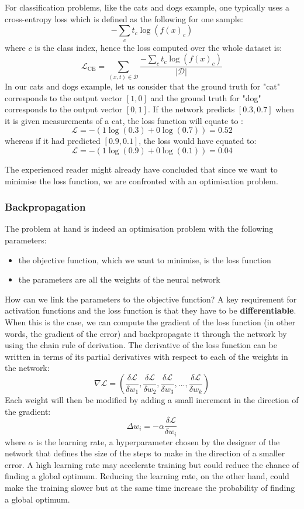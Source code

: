 For classification problems, like the cats and dogs example, one typically uses
a cross-entropy loss which is defined as the following for one sample:
$$-\sum\limits_c t_c\log(f(x)_c)$$
where $c$ is the class index, hence the loss computed over the whole dataset is:
$$\mathcal{L}_{\text{CE}} = \sum\limits_{(x, t) \in \mathcal{D}}
\frac{-\sum\limits_c t_c\log(f(x)_c)}{|\mathcal{D}|}$$
In our cats and dogs example, let us consider that the ground truth for
"cat" corresponds to the output vector $[1, 0]$ and the ground truth for "dog"
corresponds to the output vector $[0, 1]$. If the network predicts $[0.3, 0.7]$
when it is given measurements of a cat, the loss function will equate to :
$$ \mathcal{L} = -(1\log(0.3) + 0\log(0.7)) = 0.52$$
whereas if it had predicted $[0.9, 0.1]$, the loss would have equated to:
$$ \mathcal{L} = -(1\log(0.9) + 0\log(0.1)) = 0.04$$

The experienced reader might already have concluded that since we want to
minimise the loss function, we are confronted with an optimisation problem.

\subsubsection{Backpropagation}
\label{sec:backprop}
The problem at hand is indeed an optimisation problem with the following
parameters:
\begin{itemize}
	\item the objective function, which we want to minimise, is the loss 
		function
	\item the parameters are all the weights of the neural network
\end{itemize}
How can we link the parameters to the objective function? A key requirement
for activation functions and the loss function is that they have to be
\textbf{differentiable}. When this is the case, we can compute the gradient
of the loss function (in other words, the gradient of the error) and 
backpropagate it through the network by using the
chain rule of derivation. The derivative of the loss function can be written
in terms of its partial derivatives with respect to each of the weights
in the network:
$$\nabla\mathcal{L} = \left(
  \frac{\delta\mathcal{L}}{\delta w_1}, 
  \frac{\delta\mathcal{L}}{\delta w_2}, 
  \frac{\delta\mathcal{L}}{\delta w_3}, ...,
  \frac{\delta\mathcal{L}}{\delta w_k}\right) 
$$
Each weight will then be modified by adding a small increment in the direction 
of the gradient:
$$ \Delta w_i = - \alpha \frac{\delta\mathcal{L}}{\delta w_i}$$
where $\alpha$ is the learning rate, a hyperparameter chosen by the designer
of the network that defines the size of the steps to make in the direction
of a smaller error. A high learning rate may accelerate training but could
reduce the chance of finding a global optimum. Reducing the learning rate,
on the other hand, could make the training slower but at the same time 
increase the probability of finding a global optimum.\\

